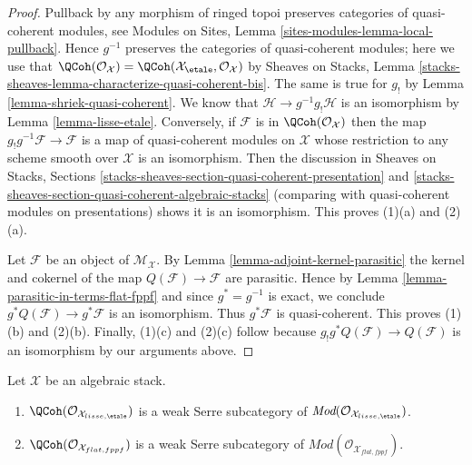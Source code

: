 \begin{proof}
Pullback by any morphism of ringed topoi preserves categories of quasi-coherent
modules, see
Modules on Sites, Lemma \ref{sites-modules-lemma-local-pullback}.
Hence $g^{-1}$ preserves the categories of quasi-coherent modules;
here we use that
$\QCoh(\mathcal{O}_\mathcal{X}) =
\QCoh(\mathcal{X}_\etale, \mathcal{O}_\mathcal{X})$
by Sheaves on Stacks, Lemma
\ref{stacks-sheaves-lemma-characterize-quasi-coherent-bis}.
The same is true for $g_!$ by
Lemma \ref{lemma-shriek-quasi-coherent}.
We know that $\mathcal{H} \to g^{-1}g_!\mathcal{H}$ is an isomorphism by
Lemma \ref{lemma-lisse-etale}.
Conversely, if $\mathcal{F}$ is in $\QCoh(\mathcal{O}_\mathcal{X})$
then the map $g_!g^{-1}\mathcal{F} \to \mathcal{F}$ is a map of quasi-coherent
modules on $\mathcal{X}$ whose restriction to any scheme smooth over
$\mathcal{X}$ is an isomorphism. Then the discussion in
Sheaves on Stacks, Sections
\ref{stacks-sheaves-section-quasi-coherent-presentation} and
\ref{stacks-sheaves-section-quasi-coherent-algebraic-stacks}
(comparing with quasi-coherent modules on presentations)
shows it is an isomorphism. This proves (1)(a) and (2)(a).

\medskip\noindent
Let $\mathcal{F}$ be an object of $\mathcal{M}_\mathcal{X}$. By
Lemma \ref{lemma-adjoint-kernel-parasitic}
the kernel and cokernel of the map
$Q(\mathcal{F}) \to \mathcal{F}$ are parasitic. Hence by
Lemma \ref{lemma-parasitic-in-terms-flat-fppf}
and since $g^* = g^{-1}$ is exact, we conclude
$g^*Q(\mathcal{F}) \to g^*\mathcal{F}$ is an isomorphism. Thus
$g^*\mathcal{F}$ is quasi-coherent. This proves (1)(b) and (2)(b).
Finally, (1)(c) and (2)(c) follow because
$g_!g^*Q(\mathcal{F}) \to Q(\mathcal{F})$ is an isomorphism by
our arguments above.
\end{proof}

\begin{lemma}
\label{lemma-quasi-coherent-weak-serre}
Let $\mathcal{X}$ be an algebraic stack.
\begin{enumerate}
\item $\QCoh(\mathcal{O}_{\mathcal{X}_{lisse,\etale}})$
is a weak Serre subcategory of
$\textit{Mod}(\mathcal{O}_{\mathcal{X}_{lisse,\etale}})$.
\item $\QCoh(\mathcal{O}_{\mathcal{X}_{flat,fppf}})$
is a weak Serre subcategory of
$\textit{Mod}(\mathcal{O}_{\mathcal{X}_{flat,fppf}})$.
\end{enumerate}
\end{lemma}

